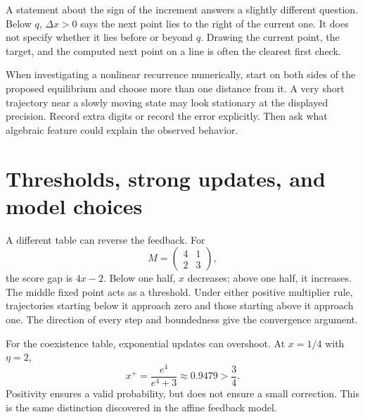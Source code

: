 \documentclass[11pt,oneside,openany]{book}
\theoremstyle{definition}
\theoremstyle{remark}
\numberwithin{equation}{chapter}
\begin{document}
A statement about the sign of the increment answers a slightly different question. Below \(q\), \(\Delta x>0\) says the next point lies to the right of the current one. It does not specify whether it lies before or beyond \(q\). Drawing the current point, the target, and the computed next point on a line is often the clearest first check.

When investigating a nonlinear recurrence numerically, start on both sides of the proposed equilibrium and choose more than one distance from it. A very short trajectory near a slowly moving state may look stationary at the displayed precision. Record extra digits or record the error explicitly. Then ask what algebraic feature could explain the observed behavior.

\section{Thresholds, strong updates, and model choices}\label{ch02-thresholds-strong-updates-and-model-choices}

A different table can reverse the feedback. For \[M=\begin{pmatrix}4&1\\2&3\end{pmatrix},\] the score gap is \(4x-2\). Below one half, \(x\) decreases; above one half, it increases. The middle fixed point acts as a threshold. Under either positive multiplier rule, trajectories starting below it approach zero and those starting above it approach one. The direction of every step and boundedness give the convergence argument.

For the coexistence table, exponential updates can overshoot. At \(x=1/4\) with \(\eta=2\), \[x^+=\frac{e^4}{e^4+3}\approx0.9479>\frac34.\] Positivity ensures a valid probability, but does not ensure a small correction. This is the same distinction discovered in the affine feedback model.
\end{document}
